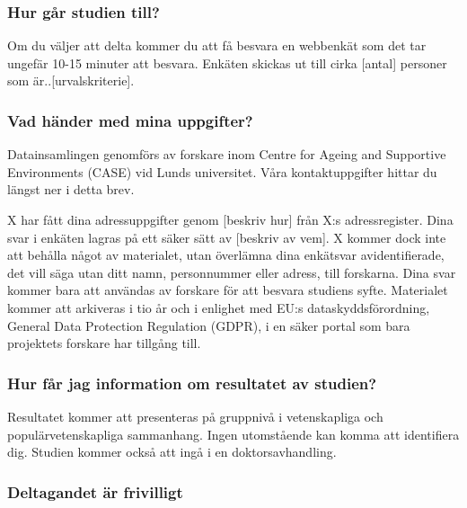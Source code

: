 \documentclass[]{tufte-handout}
\begin{document}
\hypertarget{hur-guxe5r-studien-till}{%
\subsubsection{Hur går studien till?}\label{hur-guxe5r-studien-till}}

Om du väljer att delta kommer du att få besvara en webbenkät som det tar
ungefär 10-15 minuter att besvara. Enkäten skickas ut till cirka
{[}antal{]} personer som är..{[}urvalskriterie{]}.

\hypertarget{vad-huxe4nder-med-mina-uppgifter}{%
\subsubsection{Vad händer med mina
uppgifter?}\label{vad-huxe4nder-med-mina-uppgifter}}

Datainsamlingen genomförs av forskare inom Centre for Ageing and
Supportive Environments (CASE) vid Lunds universitet. Våra
kontaktuppgifter hittar du längst ner i detta brev.

X har fått dina adressuppgifter genom {[}beskriv hur{]} från X:s
adressregister. Dina svar i enkäten lagras på ett säker sätt av
{[}beskriv av vem{]}. X kommer dock inte att behålla något av
materialet, utan överlämna dina enkätsvar avidentifierade, det vill säga
utan ditt namn, personnummer eller adress, till forskarna. Dina svar
kommer bara att användas av forskare för att besvara studiens syfte.
Materialet kommer att arkiveras i tio år och i enlighet med EU:s
dataskyddsförordning, General Data Protection Regulation (GDPR), i en
säker portal som bara projektets forskare har tillgång till.

\hypertarget{hur-fuxe5r-jag-information-om-resultatet-av-studien}{%
\subsubsection{Hur får jag information om resultatet av
studien?}\label{hur-fuxe5r-jag-information-om-resultatet-av-studien}}

Resultatet kommer att presenteras på gruppnivå i vetenskapliga och
populärvetenskapliga sammanhang. Ingen utomstående kan komma att
identifiera dig. Studien kommer också att ingå i en doktorsavhandling.

\hypertarget{deltagandet-uxe4r-frivilligt}{%
\subsubsection{Deltagandet är
frivilligt}\label{deltagandet-uxe4r-frivilligt}}
\end{document}
